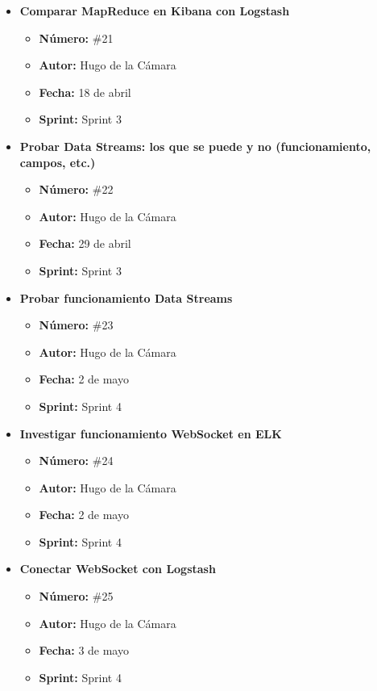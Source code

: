 \begin{itemize}
    \item \textbf{Comparar MapReduce en Kibana con Logstash}
    \begin{itemize}
        \item \textbf{Número:} \#21
        \item \textbf{Autor:} Hugo de la Cámara
        \item \textbf{Fecha:} 18 de abril
        \item \textbf{Sprint:} Sprint 3
    \end{itemize}

        \item \textbf{Probar Data Streams: los que se puede y no (funcionamiento, campos, etc.)}
    \begin{itemize}
        \item \textbf{Número:} \#22
        \item \textbf{Autor:} Hugo de la Cámara
        \item \textbf{Fecha:} 29 de abril
        \item \textbf{Sprint:} Sprint 3
    \end{itemize}

        \item \textbf{Probar funcionamiento Data Streams}
    \begin{itemize}
        \item \textbf{Número:} \#23
        \item \textbf{Autor:} Hugo de la Cámara
        \item \textbf{Fecha:} 2 de mayo
        \item \textbf{Sprint:} Sprint 4
    \end{itemize}
    
    \item \textbf{Investigar funcionamiento WebSocket en ELK}
    \begin{itemize}
        \item \textbf{Número:} \#24
        \item \textbf{Autor:} Hugo de la Cámara
        \item \textbf{Fecha:} 2 de mayo
        \item \textbf{Sprint:} Sprint 4
    \end{itemize}

        \item \textbf{Conectar WebSocket con Logstash}
    \begin{itemize}
        \item \textbf{Número:} \#25
        \item \textbf{Autor:} Hugo de la Cámara
        \item \textbf{Fecha:} 3 de mayo
        \item \textbf{Sprint:} Sprint 4
    \end{itemize}
    

\end{itemize}
